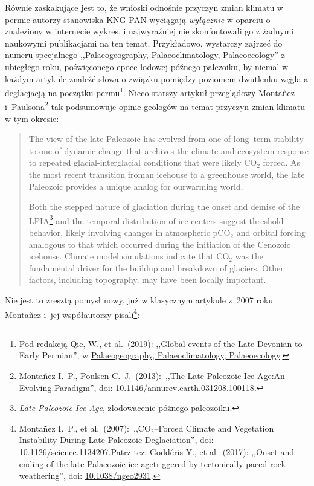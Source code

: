 \documentclass[12pt]{article}
\newcommand{\doi}[1]{doi: \href{htts://doi.org/#1}{#1}}
\begin{document}
Równie zaskakujące jest to, że wnioski odnośnie przyczyn zmian klimatu w permie autorzy stanowiska KNG PAN wyciągają \emph{wyłącznie} w oparciu o znaleziony w internecie wykres, i najwyraźniej nie skonfontowali go z żadnymi naukowymi publikacjami na ten temat. Przykładowo, wystarczy zajrzeć do numeru specjalnego ,,Palaeogeography, Palaeoclimatology, Palaeoecology'' z ubiegłego roku, poświęconego epoce lodowej późnego palezoiku, by niemal w każdym artykule znaleźć słowa o związku pomiędzy poziomem dwutlenku węgla a deglacjacją na początku permu\footnote{Pod redakcją Qie, W., et al.~(2019): ,,Global events of the Late Devonian to Early Permian'', w \href{https://www.sciencedirect.com/journal/palaeogeography-palaeoclimatology-palaeoecology/vol/531/part/PA}{Palaeogeography, Palaeoclimatology, Palaeoecology}.}. Nieco starszy artykuł przeglądowy Montañez i~Paulsona\footnote{Montañez I.~P., Poulsen C.~J.~(2013):~,,The Late Paleozoic Ice Age:An Evolving Paradigm'', \doi{10.1146/annurev.earth.031208.100118}.} tak podsumowuje opinie geologów na temat przyczyn zmian klimatu w tym okresie:

\begin{quotation}
	The view of the late Paleozoic has evolved from one of long--term stability to one of dynamic change that archives the climate and ecosystem response to repeated glacial-interglacial conditions that were likely CO$_2$ forced. As the most recent transition froman icehouse to a greenhouse world, the late Paleozoic provides a unique analog for ourwarming world.
	
	Both the stepped nature of glaciation during the onset and demise of the LPIA\footnote{\emph{Late Paleozoic Ice Age}, zlodowacenie późnego paleozoiku.} and the temporal distribution of ice centers suggest threshold behavior, likely involving changes in atmospheric pCO$_2$ and orbital forcing analogous to that which occurred during the initiation of the Cenozoic icehouse. Climate model simulations indicate that CO$_2$ was the fundamental driver for the buildup and breakdown of glaciers. Other factors, including topography, may have been locally important.
\end{quotation}

Nie jest to zresztą pomysł nowy, już w klasycznym artykule z~2007 roku Montañez i~jej współautorzy pisali\footnote{Montañez I.~P., et al.~(2007):~,,CO$_2$--Forced Climate and Vegetation Instability During Late Paleozoic Deglaciation'', \doi{10.1126/science.1134207}.Patrz też: Goddéris Y., et al.~(2017): ,,Onset and ending of the late Palaeozoic ice agetriggered by tectonically paced rock weathering'', \doi{10.1038/ngeo2931}.}:
\end{document}
